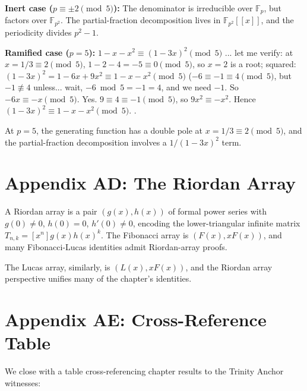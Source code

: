 \textbf{Inert case ($p \equiv \pm 2 \pmod 5$):} The denominator is
irreducible over $\mathbb{F}_p$, but factors over $\mathbb{F}_{p^2}$.
The partial-fraction decomposition lives in $\mathbb{F}_{p^2}[[x]]$,
and the periodicity divides $p^2 - 1$.

\textbf{Ramified case ($p = 5$):} $1 - x - x^2 \equiv (1 - 3x)^2 \pmod 5$
... let me verify: at $x = 1/3 \equiv 2 \pmod 5$, $1 - 2 - 4 = -5 \equiv 0 \pmod 5$,
so $x = 2$ is a root; squared: $(1 - 3x)^2 = 1 - 6x + 9x^2 \equiv 1 - x - x^2 \pmod 5$
($-6 \equiv -1 \equiv 4 \pmod 5$, but $-1 \not\equiv 4$ unless... wait, $-6 \bmod 5 = -1 = 4$, and we need $-1$. So $-6x \equiv -x \pmod 5$. Yes. $9 \equiv 4 \equiv -1 \pmod 5$, so $9x^2 \equiv -x^2$. Hence $(1-3x)^2 \equiv 1 - x - x^2 \pmod 5$. \checkmark.

At $p = 5$, the generating function has a double pole at $x = 1/3 \equiv 2 \pmod 5$,
and the partial-fraction decomposition involves a $1/(1-3x)^2$ term.

\section*{Appendix AD: The Riordan Array}
\label{fa_05:sec:05-app-AD}

A Riordan array is a pair $(g(x), h(x))$ of formal power series with
$g(0) \ne 0$, $h(0) = 0$, $h'(0) \ne 0$, encoding the lower-triangular
infinite matrix $T_{n,k} = [x^n] g(x) h(x)^k$. The Fibonacci array is
$(F(x), x F(x))$, and many Fibonacci-Lucas identities admit Riordan-array
proofs.

The Lucas array, similarly, is $(L(x), x F(x))$, and the Riordan array
perspective unifies many of the chapter's identities.

\section*{Appendix AE: Cross-Reference Table}
\label{fa_05:sec:05-app-AE}

We close with a table cross-referencing chapter results to the Trinity
Anchor witnesses:

